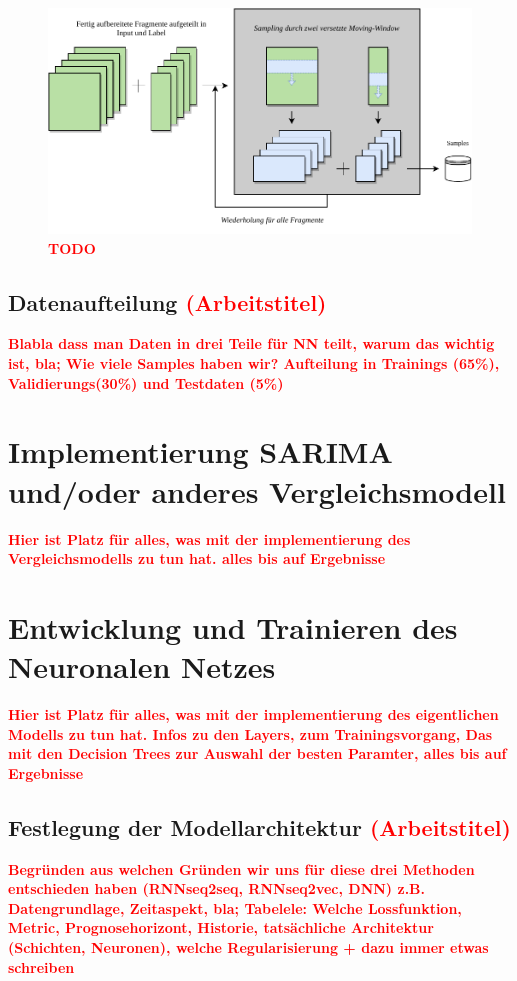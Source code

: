 \documentclass[
12pt, %
toc=listofnumbered, %
toc=chapterentrydotfill, %
numbers=noenddot, %
captions=tableheading, %
bibliography=numbered
]{scrreprt}
\let\Oldsection\section
\renewcommand{\section}{\FloatBarrier\Oldsection}
\let\Oldsubsection\subsection
\renewcommand{\subsection}{\FloatBarrier\Oldsubsection}
\newcommand{\highlight}[1]{\textbf{\textcolor{red}{#1}}}
\begin{document}
\begin{figure}[tph]
	\begin{center}
		\includegraphics[]{./images/sampling.pdf}
		\caption{\highlight{{TODO}}}
		\label{fig:sampling}
	\end{center}
\end{figure}

\subsection{Datenaufteilung \highlight{(Arbeitstitel)}}
\highlight{Blabla dass man Daten in drei Teile für NN teilt, warum das wichtig ist, bla; 
Wie viele Samples haben wir? Aufteilung in Trainings (65\%), Validierungs(30\%) und Testdaten (5\%)}

\section{Implementierung SARIMA und/oder anderes Vergleichsmodell}
\highlight{Hier ist Platz für alles, was mit der implementierung des Vergleichsmodells zu tun hat. 
alles bis auf Ergebnisse}

\section{Entwicklung und Trainieren des Neuronalen Netzes}
\highlight{Hier ist Platz für alles, was mit der implementierung des eigentlichen Modells zu tun hat. 
Infos zu den Layers, zum Trainingsvorgang, Das mit den Decision Trees zur Auswahl der besten Paramter, 
alles bis auf Ergebnisse}

\subsection{Festlegung der Modellarchitektur \highlight{(Arbeitstitel)}}
\highlight{Begründen aus welchen Gründen wir uns für diese drei Methoden entschieden haben 
(RNNseq2seq, RNNseq2vec, DNN) z.B. Datengrundlage, Zeitaspekt, bla; 
Tabelele: Welche Lossfunktion, Metric, Prognosehorizont, Historie, tatsächliche Architektur (Schichten, Neuronen), 
welche Regularisierung + dazu immer etwas schreiben }
\end{document}
